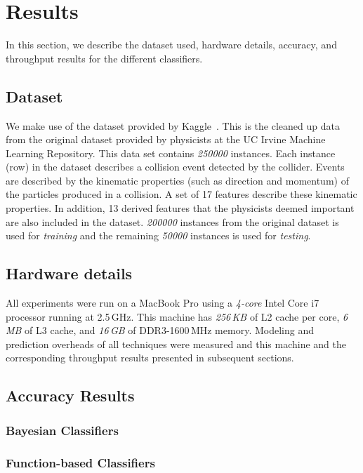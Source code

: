 \section{Results}
\label{sec:results}

In this section, we describe the dataset used, hardware details, accuracy, and throughput results for the different classifiers.

\subsection{Dataset}

We make use of the dataset provided by Kaggle~\cite{Kaggle-Dataset}. This is the cleaned up data from the original dataset provided by physicists at the UC Irvine Machine Learning Repository. This data set contains \emph{250000} instances. Each instance (row) in the dataset describes a collision event detected by the collider. Events are described by the kinematic properties (such as direction and momentum) of the particles produced in a collision. A set of 17 features describe these kinematic properties. In addition, 13 derived features that the physicists deemed important are also included in the dataset. \emph{200000} instances from the original dataset is used for \emph{training} and the remaining \emph{50000} instances is used for \emph{testing}.

\subsection{Hardware details}

All experiments were run on a MacBook Pro using a \emph{4-core} Intel Core i7 processor running at 2.5\,GHz. This machine has \emph{256\,KB} of L2 cache per core, \emph{6\,MB} of L3 cache, and \emph{16\,GB} of DDR3-1600\,MHz memory. Modeling and prediction overheads of all techniques were measured and this machine and the corresponding throughput results presented in subsequent sections.

\subsection{Accuracy Results}

\subsubsection{Bayesian Classifiers}

\subsubsection{Function-based Classifiers}


